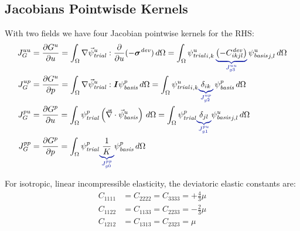 \subsection{Jacobians Pointwisde Kernels}

With two fields we have four Jacobian pointwise kernels for the RHS:
\begin{align}
  J_G^{uu} &= \frac{\partial G^u}{\partial u} = \int_\Omega \nabla \trialvec[u] : 
\frac{\partial}{\partial u}(-
\tensor{\sigma}^\mathit{dev}) \, d\Omega 
  = \int_\Omega \trialscalar[u]_{i,k} \, \eqnannotate{\left(-C^\mathit{dev}_{ikjl}\right)}
{J_{g3}^{uu}}  \, 
\basisscalar[u]_{j,l}\, d\Omega \\
  J_G^{up} &= \frac{\partial G^u}{\partial p} = \int_\Omega \nabla\trialvec[u] : \tensor{I} 
\basisscalar[p] \,  d\Omega = \int_\Omega \trialscalar[u]_{i,k} \eqnannotate{\delta_{ik}}{J_{g2}^{up}} \, 
\basisscalar[p] \, d\Omega \\
%
  J_G^{pu} &= \frac{\partial G^p}{\partial u} = \int_\Omega \trialscalar[p] \left(\vec{\nabla} 
\cdot \basisvec[u]\right) \, d\Omega = \int_\Omega \trialscalar[p] \eqnannotate{\delta_{jl}}{J_{g1}^{pu}} 
\basisscalar[u]_{j,l} \, d\Omega\\
  J_G^{pp} &= \frac{\partial G^p}{\partial p} = \int_\Omega \trialscalar[p] \eqnannotate{\frac{1}
{K}}{J_{g0}^{pp}} \basisscalar[p] \, d\Omega
\end{align}

For isotropic, linear incompressible elasticity, the deviatoric elastic constants are:
\begin{align}
    C_{1111} &= C_{2222} = C_{3333} = +\frac{4}{3} \mu \\
    C_{1122} &= C_{1133} = C_{2233} = -\frac{2}{3} \mu \\
    C_{1212} &= C_{1313} = C_{2323} = \mu
\end{align}
